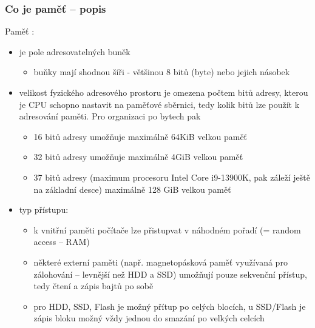 \documentclass{beamer}
\begin{document}
\begin{frame}
\frametitle{Co je paměť -- popis}

Paměť :
\begin{itemize}
\item je pole adresovatelných buněk
\begin{itemize}
\item buňky mají shodnou šíři - většinou 8 bitů (byte) nebo jejich násobek
\end{itemize}
\item velikost fyzického adresového prostoru je omezena počtem bitů adresy, kterou je CPU schopno nastavit na paměťové sběrnici, tedy kolik bitů lze použít k adresování paměti. Pro organizaci po bytech pak
\begin{itemize}
\item 16 bitů adresy umožňuje maximálně 64KiB velkou paměť
\item 32 bitů adresy umožňuje maximálně 4GiB velkou paměť
\item 37 bitů adresy (maximum procesoru Intel Core  i9-13900K, pak záleží ještě na základní desce) maximálně 128 GiB velkou paměť
\end{itemize}
\item typ přístupu:
\begin{itemize}
\item k vnitřní paměti počítače lze přistupvat v náhodném pořadí (= random access -- RAM)
\item některé externí paměti (např. magnetopásková paměť využívaná pro zálohování -- levnější než HDD a SSD) umožňují pouze sekvenční přístup, tedy čtení a zápis bajtů po sobě
\item pro HDD, SSD, Flash je možný přítup po celých blocích, u SSD/Flash je zápis bloku možný vždy jednou do smazání po velkých celcích
\end{itemize}
\end{itemize}

\end{frame}
\end{document}
